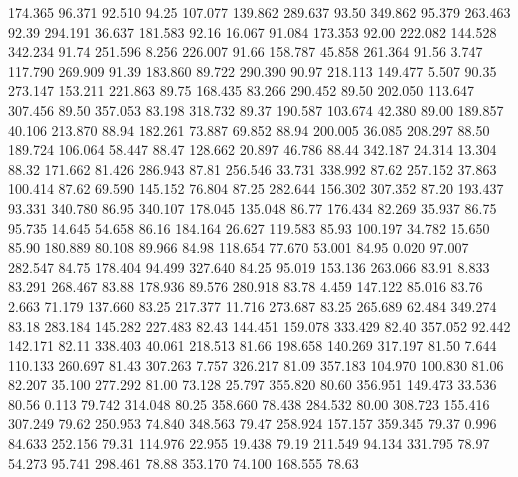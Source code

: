  174.365   96.371   92.510        94.25
 107.077  139.862  289.637        93.50
 349.862   95.379  263.463        92.39
 294.191   36.637  181.583        92.16
  16.067   91.084  173.353        92.00
 222.082  144.528  342.234        91.74
 251.596    8.256  226.007        91.66
 158.787   45.858  261.364        91.56
   3.747  117.790  269.909        91.39
 183.860   89.722  290.390        90.97
 218.113  149.477    5.507        90.35
 273.147  153.211  221.863        89.75
 168.435   83.266  290.452        89.50
 202.050  113.647  307.456        89.50
 357.053   83.198  318.732        89.37
 190.587  103.674   42.380        89.00
 189.857   40.106  213.870        88.94
 182.261   73.887   69.852        88.94
 200.005   36.085  208.297        88.50
 189.724  106.064   58.447        88.47
 128.662   20.897   46.786        88.44
 342.187   24.314   13.304        88.32
 171.662   81.426  286.943        87.81
 256.546   33.731  338.992        87.62
 257.152   37.863  100.414        87.62
  69.590  145.152   76.804        87.25
 282.644  156.302  307.352        87.20
 193.437   93.331  340.780        86.95
 340.107  178.045  135.048        86.77
 176.434   82.269   35.937        86.75
  95.735   14.645   54.658        86.16
 184.164   26.627  119.583        85.93
 100.197   34.782   15.650        85.90
 180.889   80.108   89.966        84.98
 118.654   77.670   53.001        84.95
   0.020   97.007  282.547        84.75
 178.404   94.499  327.640        84.25
  95.019  153.136  263.066        83.91
   8.833   83.291  268.467        83.88
 178.936   89.576  280.918        83.78
   4.459  147.122   85.016        83.76
   2.663   71.179  137.660        83.25
 217.377   11.716  273.687        83.25
 265.689   62.484  349.274        83.18
 283.184  145.282  227.483        82.43
 144.451  159.078  333.429        82.40
 357.052   92.442  142.171        82.11
 338.403   40.061  218.513        81.66
 198.658  140.269  317.197        81.50
   7.644  110.133  260.697        81.43
 307.263    7.757  326.217        81.09
 357.183  104.970  100.830        81.06
  82.207   35.100  277.292        81.00
  73.128   25.797  355.820        80.60
 356.951  149.473   33.536        80.56
   0.113   79.742  314.048        80.25
 358.660   78.438  284.532        80.00
 308.723  155.416  307.249        79.62
 250.953   74.840  348.563        79.47
 258.924  157.157  359.345        79.37
   0.996   84.633  252.156        79.31
 114.976   22.955   19.438        79.19
 211.549   94.134  331.795        78.97
  54.273   95.741  298.461        78.88
 353.170   74.100  168.555        78.63
